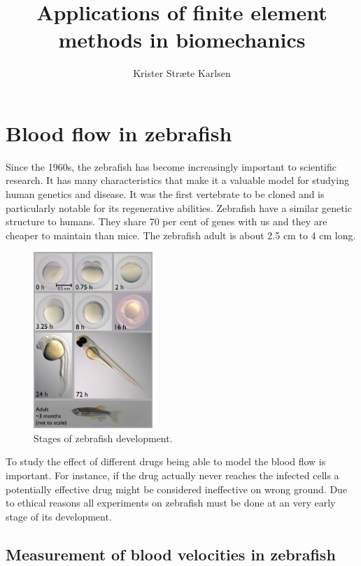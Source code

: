 \documentclass[epsfig,11pt]{article}
\title{Applications of finite element methods in biomechanics}
\author{Krister Stræte Karlsen}
\begin{document}
\maketitle

\section{Blood flow in zebrafish}

Since the 1960s, the zebrafish has become increasingly important to scientific research. It has many characteristics that make it a valuable model for studying human genetics and disease. It was the first vertebrate to be cloned and is particularly notable for its regenerative abilities. Zebrafish have a similar genetic structure to humans. They share 70 per cent of genes with us and they are cheaper to maintain than mice. The zebrafish adult is about 2.5 cm to 4 cm long. 

\begin{figure}
  \begin{center}
    \includegraphics[width=0.4\textwidth]{zebrafish.png}
  \end{center}
  \caption{Stages of zebrafish development.}
\end{figure}

To study the effect of different drugs being able to model the blood flow is important. For instance, if the drug actually never reaches the infected cells a potentially effective drug might be considered ineffective on wrong ground. Due to ethical reasons all experiments on zebrafish must be done at an very early stage of its development.


\subsection{Measurement of blood velocities in zebrafish}
\end{document}
